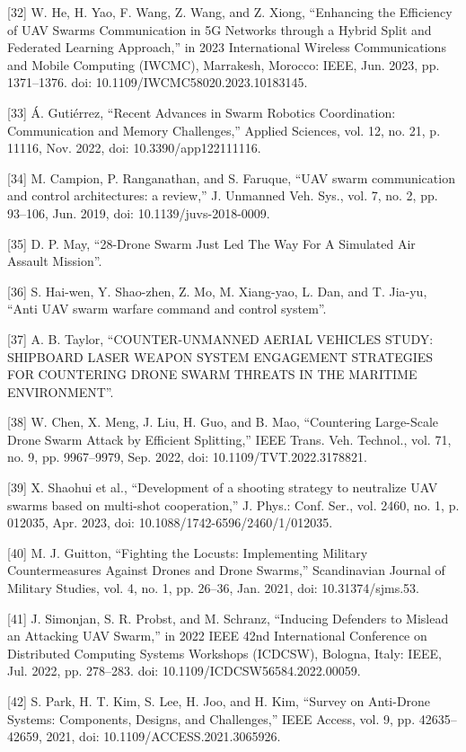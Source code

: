 [32] W. He, H. Yao, F. Wang, Z. Wang, and Z. Xiong, “Enhancing the Efficiency of UAV Swarms Communication in 5G Networks through a Hybrid Split and Federated Learning Approach,” in 2023 International Wireless Communications and Mobile Computing (IWCMC), Marrakesh, Morocco: IEEE, Jun. 2023, pp. 1371–1376. doi: 10.1109/IWCMC58020.2023.10183145.


[33] Á. Gutiérrez, “Recent Advances in Swarm Robotics Coordination: Communication and Memory Challenges,” Applied Sciences, vol. 12, no. 21, p. 11116, Nov. 2022, doi: 10.3390/app122111116.


[34] M. Campion, P. Ranganathan, and S. Faruque, “UAV swarm communication and control architectures: a review,” J. Unmanned Veh. Sys., vol. 7, no. 2, pp. 93–106, Jun. 2019, doi: 10.1139/juvs-2018-0009.


[35] D. P. May, “28-Drone Swarm Just Led The Way For A Simulated Air Assault Mission”.


[36] S. Hai-wen, Y. Shao-zhen, Z. Mo, M. Xiang-yao, L. Dan, and T. Jia-yu, “Anti UAV swarm warfare command and control system”.


[37] A. B. Taylor, “COUNTER-UNMANNED AERIAL VEHICLES STUDY: SHIPBOARD LASER WEAPON SYSTEM ENGAGEMENT STRATEGIES FOR COUNTERING DRONE SWARM THREATS IN THE MARITIME ENVIRONMENT”.


[38] W. Chen, X. Meng, J. Liu, H. Guo, and B. Mao, “Countering Large-Scale Drone Swarm Attack by Efficient Splitting,” IEEE Trans. Veh. Technol., vol. 71, no. 9, pp. 9967–9979, Sep. 2022, doi: 10.1109/TVT.2022.3178821.


[39] X. Shaohui et al., “Development of a shooting strategy to neutralize UAV swarms based on multi-shot cooperation,” J. Phys.: Conf. Ser., vol. 2460, no. 1, p. 012035, Apr. 2023, doi: 10.1088/1742-6596/2460/1/012035.


[40] M. J. Guitton, “Fighting the Locusts: Implementing Military Countermeasures Against Drones and Drone Swarms,” Scandinavian Journal of Military Studies, vol. 4, no. 1, pp. 26–36, Jan. 2021, doi: 10.31374/sjms.53.


[41] J. Simonjan, S. R. Probst, and M. Schranz, “Inducing Defenders to Mislead an Attacking UAV Swarm,” in 2022 IEEE 42nd International Conference on Distributed Computing Systems Workshops (ICDCSW), Bologna, Italy: IEEE, Jul. 2022, pp. 278–283. doi: 10.1109/ICDCSW56584.2022.00059.


[42] S. Park, H. T. Kim, S. Lee, H. Joo, and H. Kim, “Survey on Anti-Drone Systems: Components, Designs, and Challenges,” IEEE Access, vol. 9, pp. 42635–42659, 2021, doi: 10.1109/ACCESS.2021.3065926.



